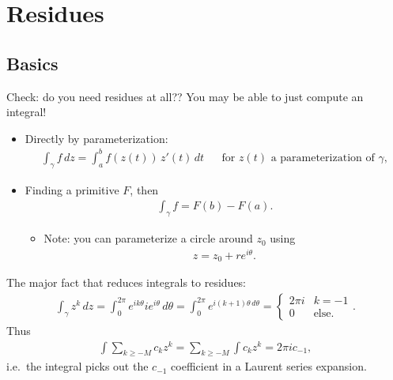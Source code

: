 \hypertarget{residues}{%
\section{Residues}\label{residues}}

\hypertarget{basics}{%
\subsection{Basics}\label{basics}}

\begin{remark}

Check: do you need residues at all?? You may be able to just compute an
integral!

\begin{itemize}
\item
  Directly by parameterization:
  \begin{align*}
  \int_\gamma f \,dz= \int_a^b f(z(t))\, z'(t) \,dt&& \text{for } z(t) \text{ a parameterization of } \gamma
  ,\end{align*}
\item
  Finding a primitive \(F\), then
  \begin{align*}
  \int_\gamma f = F(b) - F(a)
  .\end{align*}

  \begin{itemize}
  \tightlist
  \item
    Note: you can parameterize a circle around \(z_0\) using
    \begin{align*}
    z= z_0 + re^{i \theta }
    .\end{align*}
  \end{itemize}
\end{itemize}

\end{remark}

\begin{fact}

The major fact that reduces integrals to residues:
\begin{align*}
\int_\gamma z^k \,dz= \int_0^{2\pi} e^{ik\theta} ie^{i\theta } \,d\theta= \int_0^{2\pi} e^{i(k+1)\theta \,d\theta}
=
\begin{cases}
2\pi i & k=-1 
\\
0 & \text{else}.
\end{cases}
.\end{align*}
Thus
\begin{align*}
\int \sum_{k\geq -M} c_k z^k = \sum_{k\geq -M} \int c_k z^k = 2\pi i c_{-1}
,\end{align*}
i.e.~the integral picks out the \(c_{-1}\) coefficient in a Laurent
series expansion.

\end{fact}

